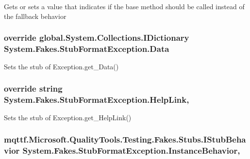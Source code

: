 Gets or sets a value that indicates if the base method should be called instead of the fallback behavior

\hypertarget{class_system_1_1_fakes_1_1_stub_format_exception_a0490d63ec090f4942a8b395efee7171d}{
\subsubsection[{Data}]{\setlength{\rightskip}{0pt plus 5cm}override global.\-System.\-Collections.\-I\-Dictionary System.\-Fakes.\-Stub\-Format\-Exception.\-Data\hspace{0.3cm}{\ttfamily [get]}}}\label{class_system_1_1_fakes_1_1_stub_format_exception_a0490d63ec090f4942a8b395efee7171d}


Sets the stub of Exception.\-get\-\_\-\-Data()

\hypertarget{class_system_1_1_fakes_1_1_stub_format_exception_aa2a4b07c3883c7dd183ae43bfd551d2e}{
\subsubsection[{Help\-Link}]{\setlength{\rightskip}{0pt plus 5cm}override string System.\-Fakes.\-Stub\-Format\-Exception.\-Help\-Link\hspace{0.3cm}{\ttfamily [get]}, {\ttfamily [set]}}}\label{class_system_1_1_fakes_1_1_stub_format_exception_aa2a4b07c3883c7dd183ae43bfd551d2e}


Sets the stub of Exception.\-get\-\_\-\-Help\-Link()

\hypertarget{class_system_1_1_fakes_1_1_stub_format_exception_a89b96b183a42e0e3b2429dde6dbaef03}{
\subsubsection[{Instance\-Behavior}]{\setlength{\rightskip}{0pt plus 5cm}mqttf.\-Microsoft.\-Quality\-Tools.\-Testing.\-Fakes.\-Stubs.\-I\-Stub\-Behavior System.\-Fakes.\-Stub\-Format\-Exception.\-Instance\-Behavior\hspace{0.3cm}{\ttfamily [get]}, {\ttfamily [set]}}}\label{class_system_1_1_fakes_1_1_stub_format_exception_a89b96b183a42e0e3b2429dde6dbaef03}


